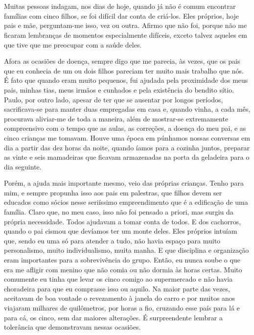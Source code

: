 \chapter{}
Muitas pessoas indagam, nos dias de hoje, quando já não é comum encontrar famílias com cinco filhos, se foi difícil dar conta de criá-los.
Eles próprios, hoje pais e mãe, perguntam-me isso, vez ou outra.
Afirmo que não foi, porque não me ficaram lembranças de momentos especialmente difíceis, exceto talvez aqueles em que tive que me preocupar com a saúde deles.


Afora as ocasiões de doença, sempre digo que me parecia, às vezes, que os pais que eu conhecia de um ou dois filhos pareciam ter muito mais trabalho que nós.
É fato que quando eram muito pequenos, fui ajudada pela proximidade dos meus pais, minhas tias, meus irmãos e cunhados e pela existência do bendito sítio.
Paulo, por outro lado, apesar de ter que se ausentar por longos períodos, sacrificava-se para manter duas empregadas em casa e, quando vinha, a cada mês, procurava aliviar-me de toda a maneira, além de mostrar-se extremamente compreensivo com o tempo que as aulas, as correções, a doença do meu pai, e as cinco crianças me tomavam.
Houve uma época em púnhamos nossas conversas em dia a partir das dez horas da noite, quando íamos para a cozinha juntos, preparar as vinte e seis mamadeiras que ficavam armazenadas na porta da geladeira para o dia seguinte.


Porém, a ajuda mais importante mesmo, veio das próprias crianças.
Tenho para mim, e sempre propunha isso aos pais em palestras, que filhos devem ser educados como sócios nesse seriíssimo empreendimento que é a edificação de uma família.
Claro que, no meu caso, isso não foi pensado a priori, mas surgiu da própria necessidade.
Todos ajudavam a tomar conta de todos.
E dos cachorros, quando o pai cismou que devíamos ter um monte deles.
Eles próprios intuíam que, sendo eu uma só para atender a tudo, não havia espaço para muito personalismo, muito individualismo, muita manha.
E que disciplina e organização eram importantes para a sobrevivência do grupo.
Então, eu nunca soube o que era me afligir com menino que não comia ou não dormia às horas certas.
Muito comumente eu tinha que levar os cinco comigo ao supermercado e não havia choradeira para que eu comprasse isso ou aquilo.
Na maior parte das vezes, aceitavam de boa vontade o revezamento à janela do carro e por muitos anos viajaram milhares de quilômetros, por horas a fio, cruzando esse país para lá e para cá, os cinco, sem dar maiores alterações.
É surpreendente lembrar a tolerância que demonstravam nessas ocasiões.


